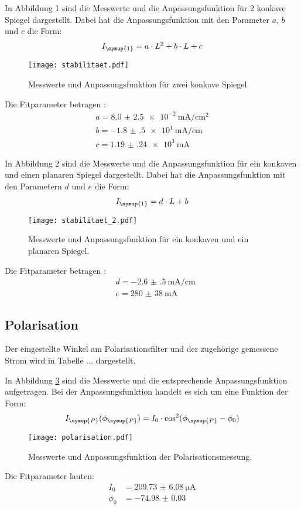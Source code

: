 In Abbildung 1 sind die Messwerte und die Anpassungsfunktion für 2 konkave Spiegel dargestellt.
Dabei hat die Anpassungsfunktion mit den Parameter $a$, $b$ und $c$ die Form:
\begin{align*}
  I_{\symup{1}} = a \cdot L^2 + b \cdot L + c
\end{align*}
\begin{figure}[H]
  \centering
  \texttt{[image: stabilitaet.pdf]}
  \caption{Messwerte und Anpassungsfunktion für zwei konkave Spiegel.}
  \label{fig:plot}
\end{figure}

Die Fitparameter betragen :
\begin{align*}
  a = \SI{ 8.0(25)e-2}{\milli\ampere\per\centi\meter\squared} \\
  b = \SI{-1.8(5)e1}{\milli\ampere\per\centi\meter} \\
  c = \SI{1.19(24)e3}{\milli\ampere}
\end{align*}


In Abbildung 2 sind die Messwerte und die Anpassungsfunktion für ein konkaven und einen
planaren Spiegel dargestellt.
Dabei hat die Anpassungsfunktion mit den Parametern $d$ und $e$ die Form:
\begin{align*}
  I_{\symup{1}} = d \cdot L + b
\end{align*}

\begin{figure}[H]
  \centering
  \texttt{[image: stabilitaet\_2.pdf]}
  \caption{Messwerte und Anpassungsfunktion für ein konkaven und ein planaren Spiegel.}
  \label{fig:plot}
\end{figure}

Die Fitparameter betragen :
\begin{align*}
  &d = \SI{-2.6(5)}{\milli\ampere\per\centi\meter} \\
  &e = \SI{280(38)}{\milli\ampere}
\end{align*}


\subsection{Polarisation}
Der eingestellte Winkel am Polarisationsfilter und der zugehörige gemessene Strom
wird in Tabelle ... dargestellt.

In Abbildung \ref{fig:polarisation} sind die Messwerte und die entsprechende
Anpassungsfunktion aufgetragen. Bei der Anpassungsfunktion handelt es sich um eine
Funktion der Form:
\begin{equation*}
  I_\symup{P}(\phi_\symup{P}) = I_0 \cdot \cos^2(\phi_\symup{P} - \phi_0)
\end{equation*}

\begin{figure}[H]
  \centering
  \texttt{[image: polarisation.pdf]}
  \caption{Messwerte und Anpassungsfunktion der Polarisationsmessung.}
  \label{fig:polarisation}
\end{figure}

Die Fitparameter lauten:
\begin{align*}
  I_0 &= \SI{209.73(608)}{\micro\ampere} \\
  \phi_0 &= \SI{-74.98(3)}{}
\end{align*}
